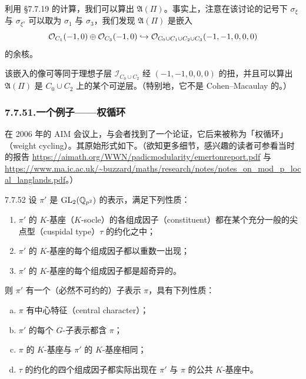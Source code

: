 利用 §7.7.19 的计算，我们可以算出 $\mathfrak A(\Pi)$。事实上，注意在该讨论的记号下 $\sigma_\xi$ 与 $\sigma_{\xi^s}$ 可以取为 $\sigma_1$ 与 $\sigma_3$，我们发现 $\mathfrak A(\Pi)$ 是嵌入
\[
\mathcal{O}_{C_1}(-1,0)\oplus\mathcal{O}_{C_3}(-1,0)\hookrightarrow\mathcal{O}_{C_0\cup C_1\cup C_2\cup C_3}(-1,-1,0,0,0)
\]
的余核。

该嵌入的像可等同于理想子层 $\mathcal I_{C_0\cup C_2}$ 经 $(-1,-1,0,0,0)$ 的扭，并且可以算出 $\mathfrak A(\Pi)$ 是 $C_0\cup C_2$ 上的某个可逆层。（特别地，它不是 Cohen--Macaulay 的。）

\subsubsection*{7.7.51.\quad 一个例子——权循环}
在 2006 年的 AIM 会议上，与会者找到了一个论证，它后来被称为「权循环」（weight cycling）。其原始形式如下。（欲知更多细节，感兴趣的读者可参看当时的报告 \url{https://aimath.org/WWN/padicmodularity/emertonreport.pdf} 与 \url{https://www.ma.ic.ac.uk/~buzzard/maths/research/notes/notes_on_mod_p_local_langlands.pdf}。）

\begin{prop}{7.7.52}\label{prop:a4-7-7-52}
设 $\pi'$ 是 $\mathrm{GL}_2(\mathbb{Q}_{p^2})$ 的表示，满足下列性质：
\begin{enumerate}[(1)]
\item $\pi'$ 的 $K$-基座（$K$-socle）的各组成因子（constituent）都在某个充分一般的尖点型（cuspidal type）$\tau$ 的约化之中；
\item $\pi'$ 的 $K$-基座的每个组成因子都以重数一出现；
\item $\pi'$ 的 $K$-基座的每个组成因子都是超奇异的。
\end{enumerate}
则 $\pi'$ 有一个（必然不可约的）子表示 $\pi$，具有下列性质：
\begin{enumerate}[(a)]
\item $\pi$ 有中心特征（central character）；
\item $\pi'$ 的每个 $G$-子表示都含 $\pi$；
\item $\pi$ 的 $K$-基座与 $\pi'$ 的 $K$-基座相同；
\item $\tau$ 的约化的四个组成因子都实际出现在 $\pi'$ 与 $\pi$ 的公共 $K$-基座中。
\end{enumerate}
\end{prop}

